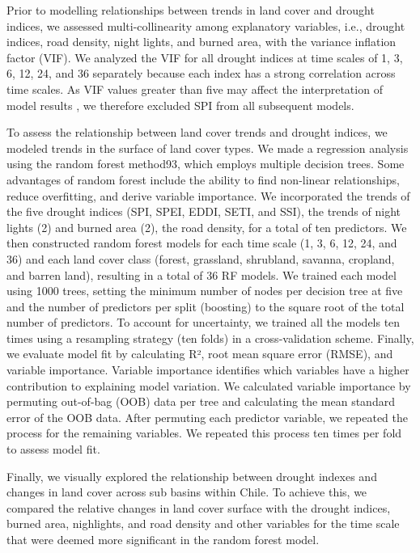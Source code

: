 \documentclass[
  sn-nature,
  numbered]{sn-jnl}
\begin{document}
Prior to modelling relationships between trends in land cover and
drought indices, we assessed multi-collinearity among explanatory
variables, i.e., drought indices, road density, night lights, and burned
area, with the variance inflation factor (VIF). We analyzed the VIF for
all drought indices at time scales of 1, 3, 6, 12, 24, and 36 separately
because each index has a strong correlation across time scales. As VIF
values greater than five may affect the interpretation of model results
\citep{Dorman2013}, we therefore excluded SPI from all subsequent
models.

To assess the relationship between land cover trends and drought
indices, we modeled trends in the surface of land cover types. We made a
regression analysis using the random forest method93, which employs
multiple decision trees. Some advantages of random forest include the
ability to find non-linear relationships, reduce overfitting, and derive
variable importance. We incorporated the trends of the five drought
indices (SPI, SPEI, EDDI, SETI, and SSI), the trends of night lights (2)
and burned area (2), the road density, for a total of ten predictors. We
then constructed random forest models for each time scale (1, 3, 6, 12,
24, and 36) and each land cover class (forest, grassland, shrubland,
savanna, cropland, and barren land), resulting in a total of 36 RF
models. We trained each model using 1000 trees, setting the minimum
number of nodes per decision tree at five and the number of predictors
per split (boosting) to the square root of the total number of
predictors. To account for uncertainty, we trained all the models ten
times using a resampling strategy (ten folds) in a cross-validation
scheme. Finally, we evaluate model fit by calculating R², root mean
square error (RMSE), and variable importance. Variable importance
identifies which variables have a higher contribution to explaining
model variation. We calculated variable importance by permuting
out-of-bag (OOB) data per tree and calculating the mean standard error
of the OOB data. After permuting each predictor variable, we repeated
the process for the remaining variables. We repeated this process ten
times per fold to assess model fit.

Finally, we visually explored the relationship between drought indexes
and changes in land cover across sub basins within Chile. To achieve
this, we compared the relative changes in land cover surface with the
drought indices, burned area, nighlights, and road density and other
variables for the time scale that were deemed more significant in the
random forest model.
\end{document}
